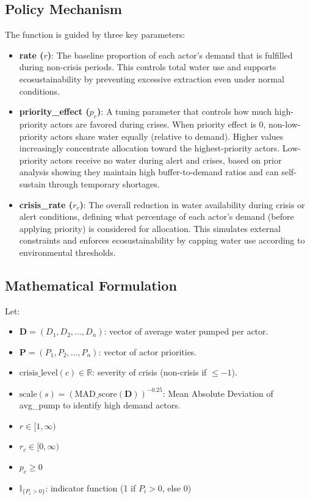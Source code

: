 \documentclass[ruler]{CUP-JNL-EDS}%
\begin{document}
\subsection{Policy Mechanism}
The function is guided by three key parameters:

\begin{itemize}
    \item \textbf{rate ($r$)}: The baseline proportion of each actor's demand that is fulfilled during non-crisis periods. 
    This controls total water use and supports ecosustainability by preventing excessive extraction even under normal conditions.
    \item \textbf{priority\_effect ($p_e$)}: A tuning parameter that controls how much high-priority actors are favored during crises.
    When priority effect is 0, non-low-priority actors share water equally (relative to demand). Higher values increasingly concentrate 
    allocation toward the highest-priority actors. Low-priority actors receive no water during alert and crises, based on prior analysis 
    showing they maintain high buffer-to-demand ratios and can self-sustain through temporary shortages.
    \item \textbf{crisis\_rate ($r_c$)}: The overall reduction in water availability during crisis or alert conditions, defining what 
    percentage of each actor’s demand (before applying priority) is considered for allocation. This simulates external constraints and enforces 
    ecosustainability by capping water use according to environmental thresholds.
\end{itemize}  
\subsection{Mathematical Formulation}
Let:
\begin{itemize}
  \item $\mathbf{D} = (D_1, D_2, \dots, D_n)$: vector of average water pumped per actor.
  \item $\mathbf{P} = (P_1, P_2, \dots, P_n)$: vector of actor priorities.
  \item $\text{crisis\_level}(c) \in \mathbb{R}$: severity of crisis (non-crisis if $\leq -1$).
  \item $\mathrm{scale}(s) = \left( \mathrm{MAD\_score}(\mathbf{D}) \right)^{-0.25}$: Mean Absolute Deviation of avg\_pump to identify high demand actors.
  \item $ r \in [1, \infty)$
  \item $r_c \in [0, \infty)$
  \item $p_e \geq 0$
  \item $\mathbb{I}_{\{P_i > 0\}}$: indicator function (1 if $P_i > 0$, else 0)
\end{itemize}
\end{document}
